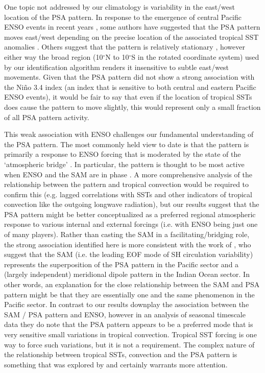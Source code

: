 One topic not addressed by our climatology is variability in the east/west location of the PSA pattern. In response to the emergence of central Pacific ENSO events in recent years \citep[e.g.][]{Ashok2007}, some authors have suggested that the PSA pattern moves east/west depending on the precise location of the associated tropical SST anomalies \citep[e.g.][]{Sun2013,Wilson2014,Ciasto2015}. Others suggest that the pattern is relatively stationary \citep[e.g.][]{Liu2007,Ding2012}, however either way the broad region (10$^{\circ}$N to 10$^{\circ}$S in the rotated coordinate system) used by our identification algorithm renders it insensitive to subtle east/west movements. Given that the PSA pattern did not show a strong association with the Ni\~{n}o 3.4 index (an index that is sensitive to both central and eastern Pacific ENSO events), it would be fair to say that even if the location of tropical SSTs does cause the pattern to move slightly, this would represent only a small fraction of all PSA pattern activity. 

This weak association with ENSO challenges our fundamental understanding of the PSA pattern. The most commonly held view to date is that the pattern is primarily a response to ENSO forcing \citep[e.g.][]{Mo2001} that is moderated by the state of the `atmospheric bridge' \citep{Liu2007}. In particular, the pattern is thought to be most active when ENSO and the SAM are in phase \citep{Fogt2006}. A more comprehensive analysis of the relationship between the pattern and tropical convection would be required to confirm this (e.g. lagged correlations with SSTs and other indicators of tropical convection like the outgoing longwave radiation), but our results suggest that the PSA pattern might be better conceptualized as a preferred regional atmospheric response to various internal and external forcings (i.e. with ENSO being just one of many players). Rather than casting the SAM in a facilitating/bridging role, the strong association identified here is more consistent with the work of \citet{Ding2012}, who suggest that the SAM (i.e. the leading EOF mode of SH circulation variability) represents the superposition of the PSA pattern in the Pacific sector and a (largely independent) meridional dipole pattern in the Indian Ocean sector. In other words, an explanation for the close relationship between the SAM and PSA pattern might be that they are essentially one and the same phenomenon in the Pacific sector. In contrast to \citet{Ding2012} our results downplay the association between the SAM / PSA pattern and ENSO, however in an analysis of seasonal timescale data they do note that the PSA pattern appears to be a preferred mode that is very sensitive small variations in tropical convection. Tropical SST forcing is one way to force such variations, but it is not a requirement. The complex nature of the relationship between tropical SSTs, convection and the PSA pattern is something that was explored by \citet{Harangozo2004} and certainly warrants more attention.  

